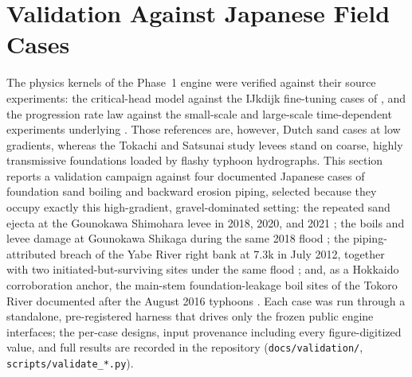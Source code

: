 %

\section{Validation Against Japanese Field Cases}
\label{sec: Validation Against Japanese Field Cases}

The physics kernels of the Phase~1 engine were verified against their source
experiments: the critical-head model against the IJkdijk fine-tuning cases of
\textcite{sellmeijer_2011}, and the progression rate law against the
small-scale and large-scale time-dependent experiments underlying
\textcite{pol_compgeo_2024}. Those references are, however, Dutch sand cases
at low gradients, whereas the Tokachi and Satsunai study levees stand on
coarse, highly transmissive foundations loaded by flashy typhoon hydrographs.
This section reports a validation campaign against four documented Japanese
cases of foundation sand boiling and backward erosion piping, selected
because they occupy exactly this high-gradient, gravel-dominated setting:
the repeated sand ejecta at the Gounokawa Shimohara levee in 2018, 2020, and
2021 \parencite{okamura_gounokawa_2025, waseda_gounokawa_dataset_2025}; the
boils and levee damage at Gounokawa Shikaga during the same 2018 flood
\parencite{sako_gounokawa_2019}; the piping-attributed breach of the Yabe
River right bank at 7.3k in July 2012, together with two
initiated-but-surviving sites under the same flood
\parencite{yabe_levee_committee_2013}; and, as a Hokkaido corroboration
anchor, the main-stem foundation-leakage boil sites of the Tokoro River
documented after the August 2016 typhoons
\parencite{tokoro_levee_committee_2017}. Each case was run through a
standalone, pre-registered harness that drives only the frozen public engine
interfaces; the per-case designs, input provenance including every
figure-digitized value, and full results are recorded in the repository
(\texttt{docs/validation/}, \texttt{scripts/validate\_*.py}).

